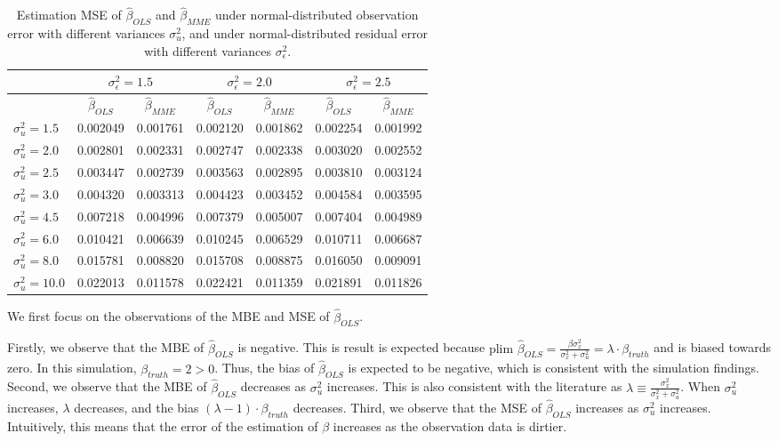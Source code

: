\documentclass{article}
\begin{document}
\begin{table}[ht]
    \centering
    \caption{Estimation MSE of $\hat{\beta}_{OLS}$ and $\hat{\beta}_{MME}$ under normal-distributed observation error with different variances $\sigma^2_u$, and under normal-distributed residual error with different variances $\sigma^2_\epsilon$.}
    \label{Tab:MSE_normal}
    \begin{tabular}[t]{lcccccc}
        \hline
        &\multicolumn{2}{c}{$\sigma^2_\epsilon=1.5$}&\multicolumn{2}{c}{$\sigma^2_\epsilon=2.0$}&\multicolumn{2}{c}{$\sigma^2_\epsilon=2.5$}\\
        \hline
        &$\hat{\beta}_{OLS}$&$\hat{\beta}_{MME}$&$\hat{\beta}_{OLS}$&$\hat{\beta}_{MME}$&$\hat{\beta}_{OLS}$&$\hat{\beta}_{MME}$\\
        \hline
        $\sigma^2_u = 1.5$&0.002049&0.001761&0.002120&0.001862&0.002254&0.001992\\
        $\sigma^2_u = 2.0$&0.002801&0.002331&0.002747&0.002338&0.003020&0.002552\\
        $\sigma^2_u = 2.5$&0.003447&0.002739&0.003563&0.002895&0.003810&0.003124\\
        $\sigma^2_u = 3.0$&0.004320&0.003313&0.004423&0.003452&0.004584&0.003595\\
        $\sigma^2_u = 4.5$&0.007218&0.004996&0.007379&0.005007&0.007404&0.004989\\
        $\sigma^2_u = 6.0$&0.010421&0.006639&0.010245&0.006529&0.010711&0.006687\\
        $\sigma^2_u = 8.0$&0.015781&0.008820&0.015708&0.008875&0.016050&0.009091\\
        $\sigma^2_u = 10.0$&0.022013&0.011578&0.022421&0.011359&0.021891&0.011826\\
        \hline
    \end{tabular}
\end{table}

We first focus on the observations of the MBE and MSE of $\hat{\beta}_{OLS}$.

Firstly, we observe that the MBE of $\hat{\beta}_{OLS}$ is negative.
This is result is expected because $\textrm{plim } \hat{\beta}_{OLS} = \frac{\beta \sigma^2_x}{\sigma^2_x + \sigma^2_u} = \lambda \cdot \beta_{truth}$ and is biased towards zero.
In this simulation, $\beta_{truth} = 2 > 0$.
Thus, the bias of $\hat{\beta}_{OLS}$ is expected to be negative, which is consistent with the simulation findings.
Second, we observe that the MBE of $\hat{\beta}_{OLS}$ decreases as $\sigma^2_u$ increases.
This is also consistent with the literature as $\lambda \equiv \frac{\sigma_x^2}{\sigma_x^2 + \sigma_u^2}$.
When $\sigma^2_u$ increases, $\lambda$ decreases, and the bias $(\lambda-1) \cdot \beta_{truth}$ decreases.
Third, we observe that the MSE of $\hat{\beta}_{OLS}$ increases as $\sigma^2_u$ increases. Intuitively, this means that the error of the estimation of $\beta$ increases as the observation data is dirtier. 
\end{document}

